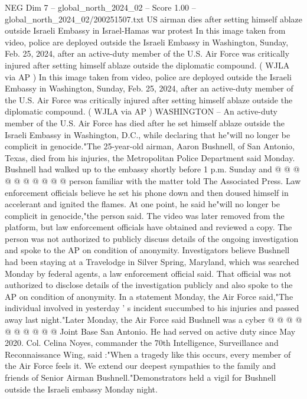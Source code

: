 \begin{textsample}{NEG Dim 7 – global\_north\_2024\_02 – Score 1.00 – global\_north\_2024\_02/200251507.txt}  \label{ex:f7_neg_434}
US airman dies after setting himself ablaze outside Israeli Embassy in Israel-Hamas war protest In this image taken from video, police are deployed outside the Israeli Embassy in Washington, Sunday, Feb. 25, 2024, after an active-duty member of the U.S.
Air Force was critically injured after setting himself ablaze outside the diplomatic compound. ( WJLA via AP ) In this image taken from video, police are deployed outside the Israeli Embassy in Washington, Sunday, Feb. 25, 2024, after an active-duty member of the U.S.
Air Force was critically injured after setting himself ablaze outside the diplomatic compound. ( WJLA via AP ) WASHINGTON -- An active-duty member of the U.S.
Air Force has died after he set himself ablaze outside the Israeli Embassy in Washington, D.C., while declaring that he"will no longer be complicit in genocide."The 25-year-old airman, Aaron Bushnell, of San Antonio, Texas, died from his injuries, the Metropolitan Police Department said Monday.
Bushnell had walked up to the embassy shortly before 1 p.m.
Sunday and @ @ @ @ @ @ @ @ @ @ person familiar with the matter told The Associated Press.
Law enforcement officials believe he set his phone down and then doused himself in accelerant and ignited the flames.
At one point, he said he"will no longer be complicit in genocide,"the person said.
The video was later removed from the platform, but law enforcement officials have obtained and reviewed a copy.
The person was not authorized to publicly discuss details of the ongoing investigation and spoke to the AP on condition of anonymity.
Investigators believe Bushnell had been staying at a Travelodge in Silver Spring, Maryland, which was searched Monday by federal agents, a law enforcement official said.
That official was not authorized to disclose details of the investigation publicly and also spoke to the AP on condition of anonymity.
In a statement Monday, the Air Force said,"The individual involved in yesterday ' s incident succumbed to his injuries and passed away last night."Later Monday, the Air Force said Bushnell was a cyber @ @ @ @ @ @ @ @ @ @ Joint Base San Antonio.
He had served on active duty since May 2020.
Col.
Celina Noyes, commander the 70th Intelligence, Surveillance and Reconnaissance Wing, said :"When a tragedy like this occurs, every member of the Air Force feels it.
We extend our deepest sympathies to the family and friends of Senior Airman Bushnell."Demonstrators held a vigil for Bushnell outside the Israeli embassy Monday night.

\end{textsample}

